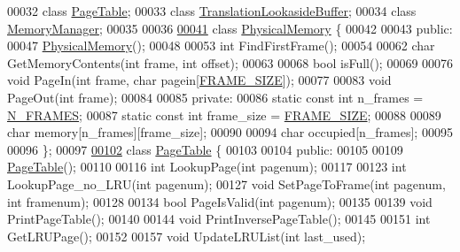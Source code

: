 \begin{DoxyCode}
00032 \textcolor{keyword}{class }\hyperlink{classPageTable}{PageTable};
00033 \textcolor{keyword}{class }\hyperlink{classTranslationLookasideBuffer}{TranslationLookasideBuffer};
00034 \textcolor{keyword}{class }\hyperlink{classMemoryManager}{MemoryManager};
00035 
00036 
\hypertarget{memory_8h_source.tex_l00041}{}\hyperlink{classPhysicalMemory}{00041} \textcolor{keyword}{class }\hyperlink{classPhysicalMemory}{PhysicalMemory} \{
00042 
00043 \textcolor{keyword}{public}:
00047     \hyperlink{classPhysicalMemory}{PhysicalMemory}();
00048     
00053     \textcolor{keywordtype}{int} FindFirstFrame();
00054     
00062     \textcolor{keywordtype}{char} GetMemoryContents(\textcolor{keywordtype}{int} frame, \textcolor{keywordtype}{int} offset);
00063 
00068     \textcolor{keywordtype}{bool} isFull();
00069 
00076     \textcolor{keywordtype}{void} PageIn(\textcolor{keywordtype}{int} frame, \textcolor{keywordtype}{char} pagein[\hyperlink{memory_8h_af9b1b2ba12857a4bf11289dac8c5462d}{FRAME\_SIZE}]);
00077 
00083     \textcolor{keywordtype}{void} PageOut(\textcolor{keywordtype}{int} frame);
00084 
00085 \textcolor{keyword}{private}:
00086     \textcolor{keyword}{static} \textcolor{keyword}{const} \textcolor{keywordtype}{int} n\_frames = \hyperlink{memory_8h_a0b0ce802de0cae773522024d7626b007}{N\_FRAMES};
00087     \textcolor{keyword}{static} \textcolor{keyword}{const} \textcolor{keywordtype}{int} frame\_size = \hyperlink{memory_8h_af9b1b2ba12857a4bf11289dac8c5462d}{FRAME\_SIZE};
00088 
00089     \textcolor{keywordtype}{char} memory[n\_frames][frame\_size];
00090 
00094     \textcolor{keywordtype}{char} occupied[n\_frames];
00095 
00096 \};  
00097 
\hypertarget{memory_8h_source.tex_l00102}{}\hyperlink{classPageTable}{00102} \textcolor{keyword}{class }\hyperlink{classPageTable}{PageTable} \{
00103 
00104 \textcolor{keyword}{public}:
00105 
00109     \hyperlink{classPageTable}{PageTable}();
00110 
00116     \textcolor{keywordtype}{int} LookupPage(\textcolor{keywordtype}{int} pagenum);
00117 
00123     \textcolor{keywordtype}{int} LookupPage\_no\_LRU(\textcolor{keywordtype}{int} pagenum);
00127     \textcolor{keywordtype}{void} SetPageToFrame(\textcolor{keywordtype}{int} pagenum, \textcolor{keywordtype}{int} framenum);
00128 
00134     \textcolor{keywordtype}{bool} PageIsValid(\textcolor{keywordtype}{int} pagenum);
00135 
00139     \textcolor{keywordtype}{void} PrintPageTable();
00140 
00144     \textcolor{keywordtype}{void} PrintInversePageTable();
00145 
00151     \textcolor{keywordtype}{int} GetLRUPage();
00152 
00157     \textcolor{keywordtype}{void} UpdateLRUList(\textcolor{keywordtype}{int} last\_used);

\end{DoxyCode}
